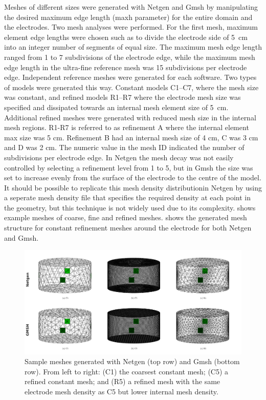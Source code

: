 Meshes of different sizes were generated with Netgen and Gmsh by manipulating the desired
maximum edge length (maxh parameter) for the entire domain and the electrodes.
Two  mesh analyses were performed. For the first
mesh, maximum element edge lengths were
chosen such as to divide the electrode side of 5~cm into an integer number of
segments of equal size. 
The maximum mesh edge length ranged from 1 to 7 subdivisions of the electrode 
edge, while the maximum mesh edge length in the ultra-fine reference mesh  
was 15 subdivisions per 
electrode edge. Independent reference meshes were generated for each software.
Two types of models were generated this way. Constant models C1--C7, where the mesh size 
was constant, and refined models R1--R7 where the electrode mesh size was specified and 
dissipated towards an internal mesh element size of 5 cm. Additional refined meshes were
generated with reduced mesh size in the internal mesh regions.  
R1-R7 is referred to as refinement A where the internal element max size was 5 cm. Refinement 
B had an internal mesh size of 4 cm, C was 3 cm and D was 2 cm.
The numeric value in the mesh 
ID indicated the number of subdivisions per electrode edge. 
In Netgen the mesh decay was not easily controlled by selecting a refinement 
level from 1 to 5, but in Gmsh the size was set 
to increase evenly from the surface of the electrode to the centre of the model.
It should be possible to replicate this mesh density distributionin Netgen by using a 
seperate mesh density file that specifies the required density at each point in the geometry,
but this technique is not widely used due to its complexity.
 shows example meshes of coarse, fine and refined
meshes.  shows the generated mesh structure for 
constant refinement meshes around the electrode 
for both Netgen and Gmsh. 


\begin{figure}[H]
   \includegraphics[width=\columnwidth]{chapter4-mesh_refinement/imgs/sample_meshes.pdf}
   \caption[Example meshes for various refinement strategies]{\label{fig:sample_meshes} 
   Sample meshes generated with Netgen (top row)
   and Gmsh (bottom row). From left to right: (C1) the coarsest constant
   mesh; (C5) a refined constant mesh; and (R5) a refined mesh with the same
   electrode mesh density as C5 but lower internal mesh density.}
\end{figure}

